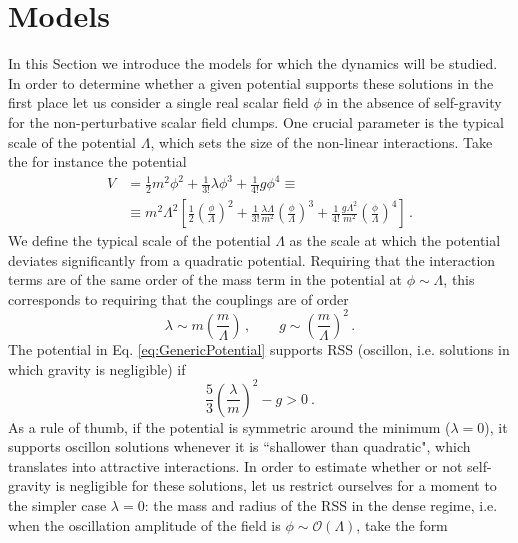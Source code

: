 \documentclass[11pt,a4paper]{article}
\begin{document}
\section{Models}
\label{sec:Models}

In this Section we introduce the models for which the dynamics will be studied.
In order to determine whether a given potential supports these solutions in the first place let us  consider a single real scalar field $\phi$ in the absence of self-gravity for the non-perturbative scalar field clumps. One crucial parameter is the typical scale of the potential $\Lambda$, which sets the size of the non-linear interactions. Take the for instance the potential
\begin{align}
\label{eq:GenericPotential}
V &= \frac{1}{2} m^2 \phi^2 + \frac{1}{3!} \lambda \phi^3 + \frac{1}{4!} g \phi^4 \equiv \nonumber  \\
&\equiv m^2 \Lambda^2\left[ \frac{1}{2} \left(\frac{\phi}{\Lambda}\right)^2 + \frac{1}{3!} \frac{\lambda \Lambda}{m^2} \left(\frac{\phi}{\Lambda}\right)^3 + \frac{1}{4!} \frac{g \Lambda^2}{m^2} \left(\frac{\phi}{\Lambda}\right)^4 \right] \,.
\end{align}
We define the typical scale of the potential $\Lambda$ as the scale at which the potential deviates significantly from a quadratic potential. Requiring that the interaction terms are of the same order of the mass term in the potential at $\phi \sim \Lambda$, this corresponds to requiring that the couplings are of order
\begin{equation}
\lambda \sim m \left(\frac{m}{\Lambda}\right) \,, \qquad g \sim \left(\frac{m}{\Lambda}\right)^2 \,.
\end{equation}
The potential in Eq. \eqref{eq:GenericPotential} supports RSS (oscillon, i.e. solutions in which gravity is negligible) if~\cite{Hertzberg:2010yz}
\begin{equation}
 \frac{5}{3} \left(\frac{\lambda}{m}\right)^2 - g > 0\ .
 \label{eq:formCond}
 \end{equation}
As a rule of thumb, if the potential is symmetric around the minimum ($\lambda = 0$), it supports oscillon solutions whenever it is ``shallower than quadratic", which translates into attractive interactions. In order to estimate whether or not self-gravity is negligible for these solutions, let us restrict ourselves for a moment to the simpler case $\lambda = 0$: the mass and radius of the RSS in the dense regime, i.e. when the oscillation amplitude of the field is $\phi \sim \mathcal{O}(\Lambda)$, take the form~\cite{Hertzberg:2010yz}
\end{document}
